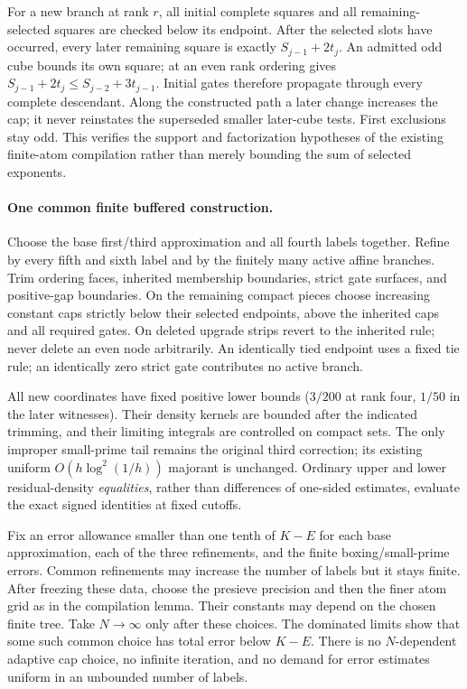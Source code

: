 For a new branch at rank $r$, all initial complete squares and
all remaining-selected squares are checked below its endpoint.
After the selected slots have occurred, every later remaining
square is exactly $S_{j-1}+2t_j$. An admitted odd cube bounds its
own square; at an even rank ordering gives
$S_{j-1}+2t_j\le S_{j-2}+3t_{j-1}$. Initial gates therefore
propagate through every complete descendant. Along the constructed
path a later change increases the cap; it never reinstates the
superseded smaller later-cube tests. First exclusions stay odd.
This verifies the support and factorization hypotheses of the
existing finite-atom compilation rather than merely bounding the
sum of selected exponents.

\paragraph{One common finite buffered construction.}
Choose the base first/third approximation and all fourth labels
together. Refine by every fifth and sixth label and by the finitely
many active affine branches. Trim ordering faces, inherited
membership boundaries, strict gate surfaces, and positive-gap
boundaries. On the remaining compact pieces choose increasing
constant caps strictly below their selected endpoints, above the
inherited caps and all required gates. On deleted upgrade strips
revert to the inherited rule; never delete an even node arbitrarily.
An identically tied endpoint uses a fixed tie rule; an identically
zero strict gate contributes no active branch.

All new coordinates have fixed positive lower bounds
($3/200$ at rank four, $1/50$ in the later witnesses).
Their density kernels are bounded after the indicated trimming,
and their limiting integrals are controlled on compact sets.
The only improper small-prime tail remains the original third
correction; its existing uniform $O(h\log^2(1/h))$ majorant
is unchanged. Ordinary upper and lower residual-density
\emph{equalities}, rather than differences of one-sided estimates,
evaluate the exact signed identities at fixed cutoffs.

Fix an error allowance smaller than one tenth of $K-E$ for each
base approximation, each of the three refinements, and the finite
boxing/small-prime errors. Common refinements may increase the
number of labels but it stays finite. After freezing these data,
choose the presieve precision and then the finer atom grid as in
the compilation lemma. Their constants may depend on the chosen
finite tree. Take $N\to\infty$ only after these choices.
The dominated limits show that some such common choice has total
error below $K-E$. There is no $N$-dependent adaptive cap choice,
no infinite iteration, and no demand for error estimates uniform
in an unbounded number of labels.

